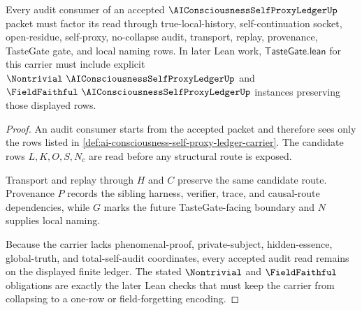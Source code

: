 \begin{theorem}
\label{thm:ai-consciousness-self-proxy-ledger-audit-route}
Every audit consumer of an accepted $\AIConsciousnessSelfProxyLedgerUp$ packet must factor its read through true-local-history, self-continuation socket, open-residue, self-proxy, no-collapse audit, transport, replay, provenance, TasteGate gate, and local naming rows. In later Lean work, $\mathsf{TasteGate.lean}$ for this carrier must include explicit $\Nontrivial\ \AIConsciousnessSelfProxyLedgerUp$ and $\FieldFaithful\ \AIConsciousnessSelfProxyLedgerUp$ instances preserving those displayed rows.
\end{theorem}
\begin{proof}
An audit consumer starts from the accepted packet and therefore sees only the rows listed in \autoref{def:ai-consciousness-self-proxy-ledger-carrier}. The candidate rows $L,K,O,S,N_c$ are read before any structural route is exposed.

Transport and replay through $H$ and $C$ preserve the same candidate route. Provenance $P$ records the sibling harness, verifier, trace, and causal-route dependencies, while $G$ marks the future TasteGate-facing boundary and $N$ supplies local naming.

Because the carrier lacks phenomenal-proof, private-subject, hidden-essence, global-truth, and total-self-audit coordinates, every accepted audit read remains on the displayed finite ledger. The stated $\Nontrivial$ and $\FieldFaithful$ obligations are exactly the later Lean checks that must keep the carrier from collapsing to a one-row or field-forgetting encoding.
\end{proof}




